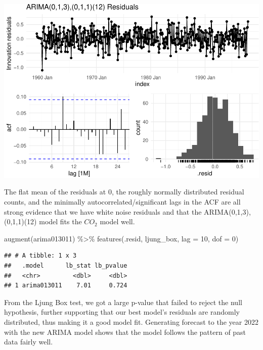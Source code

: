 \documentclass[AER]{AEA}
\newenvironment{Shaded}{\begin{snugshade}}{\end{snugshade}}
\newcommand{\AttributeTok}[1]{\textcolor[rgb]{0.77,0.63,0.00}{#1}}
\newcommand{\DecValTok}[1]{\textcolor[rgb]{0.00,0.00,0.81}{#1}}
\newcommand{\FunctionTok}[1]{\textcolor[rgb]{0.00,0.00,0.00}{#1}}
\newcommand{\NormalTok}[1]{#1}
\newcommand{\SpecialCharTok}[1]{\textcolor[rgb]{0.00,0.00,0.00}{#1}}
\begin{document}
\includegraphics{co2_1997_Qian_files/figure-latex/Best ARIMA model residual-1.pdf}

The flat mean of the residuals at 0, the roughly normally distributed
residual counts, and the minimally autocorrelated/significant lags in
the ACF are all strong evidence that we have white noise residuals and
that the ARIMA(0,1,3),(0,1,1)(12) model fits the \(CO_2\) model well.

\begin{Shaded}
\begin{Highlighting}[]
\FunctionTok{augment}\NormalTok{(arima013011) }\SpecialCharTok{\%\textgreater{}\%}
    \FunctionTok{features}\NormalTok{(.resid, ljung\_box, }\AttributeTok{lag =} \DecValTok{10}\NormalTok{, }\AttributeTok{dof =} \DecValTok{0}\NormalTok{)}
\end{Highlighting}
\end{Shaded}

\begin{verbatim}
## # A tibble: 1 x 3
##   .model      lb_stat lb_pvalue
##   <chr>         <dbl>     <dbl>
## 1 arima013011    7.01     0.724
\end{verbatim}

From the Ljung Box test, we got a large p-value that failed to reject
the null hypothesis, further supporting that our best model's residuals
are randomly distributed, thus making it a good model fit. Generating
forecast to the year 2022 with the new ARIMA model shows that the model
follows the pattern of past data fairly well.
\end{document}
